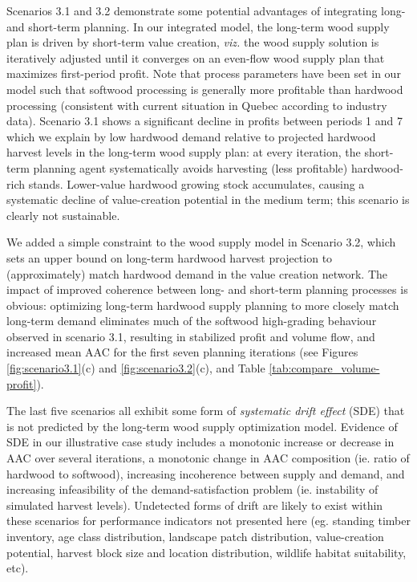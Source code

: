 Scenarios 3.1 and 3.2 demonstrate some potential advantages of
integrating long- and short-term planning. In our integrated model,
the long-term wood supply plan is driven by short-term value creation,
\emph{viz.} the  wood supply solution is iteratively adjusted until it
converges on an even-flow wood supply plan that maximizes first-period
profit. Note that process parameters have
been set in our model such that softwood processing is generally more
profitable than hardwood processing (consistent with current situation
in Quebec according to industry data). Scenario 3.1 shows a
significant decline in profits between periods 1 and 7 which we
explain by low hardwood demand relative to projected hardwood harvest
levels in the long-term wood supply plan: at every iteration, the short-term planning agent
systematically avoids harvesting (less profitable) hardwood-rich
stands. Lower-value hardwood growing stock accumulates, causing
a systematic decline of value-creation potential in the medium term;
this scenario is clearly not sustainable.

We added a simple constraint to the wood supply model in Scenario 3.2,
which sets an upper bound on long-term hardwood harvest projection
to (approximately) match hardwood demand in the value creation
network. The impact of improved coherence between long- and short-term
planning processes is obvious: optimizing long-term hardwood supply
planning to more closely match long-term demand eliminates much of the
softwood high-grading behaviour observed in scenario 3.1,
resulting in stabilized profit and volume flow, and increased mean AAC
for the first seven planning iterations (see Figures
\ref{fig:scenario3.1}(c) and \ref{fig:scenario3.2}(c), and Table
\ref{tab:compare_volume-profit}).

The last five scenarios all exhibit some form of \emph{systematic
  drift effect} (SDE) that is not predicted by the long-term wood
supply optimization model. Evidence of SDE in our illustrative case
study includes a monotonic increase or decrease in AAC over several
iterations, a monotonic change in AAC composition (ie.  ratio of
hardwood to softwood), increasing incoherence between supply and
demand, and increasing infeasibility of the demand-satisfaction problem
(ie. instability of simulated harvest levels). Undetected forms of
drift are likely to exist within these scenarios for performance
indicators not presented here (eg. standing timber inventory, age
class distribution, landscape patch distribution, value-creation
potential, harvest block size and location distribution, wildlife
habitat suitability, etc).


